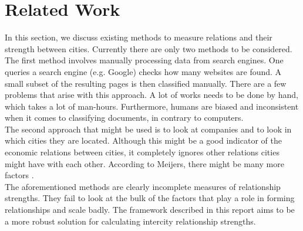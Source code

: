 \section{Related Work}
In this section, we discuss existing methods to measure relations and their strength between cities. Currently there are only two methods to be considered. \\

The first method involves manually processing data from search engines. One queries a search engine (e.g. Google) checks how many websites are found. A small subset of the resulting pages is then classified manually. There are a few problems that arise with this approach. A lot of works needs to be done by hand, which takes a lot of man-hours. Furthermore, humans are biased and inconsistent when it comes to classifying documents, in contrary to computers. \\

The second approach that might be used is to look at companies and to look in which cities they are located. Although this might be a good indicator of the economic relations between cities, it completely ignores other relations cities might have with each other. According to Meijers, there might be many more factors \cite{meijers2007synergy}.\\

The aforementioned methods are clearly incomplete measures of relationship strengths. They fail to look at the bulk of the factors that play a role in forming relationships and scale badly. The framework described in this report aims to be a more robust solution for calculating intercity relationship strengths.
